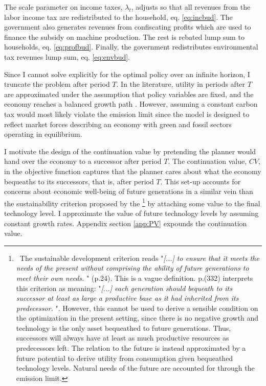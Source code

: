 The scale parameter on income taxes, $\lambda_t$, adjusts so that all revenues from the labor income tax are redistributed to the household, eq. \eqref{eq:incbud}.
The government also generates revenues from confiscating profits which are used to finance the subsidy on machine production. The rest is rebated lump sum to households, eq. \eqref{eq:profbud}. 
Finally, the government redistributes environmental tax revenues lump sum, eq. \eqref{eq:envbud}.


Since I cannot solve explicitly for the optimal policy over an infinite horizon, I truncate the problem after period $T$. 
In the literature, utility in periods after $T$ are approximated under the assumption that policy variables are fixed, and the economy reaches a balanced growth path \citep{Barrage2019OptimalPolicy, Jones1993OptimalGrowth}. However, assuming a constant carbon tax would most likely violate the emission limit since the model is designed to reflect market forces describing an economy with green and fossil sectors operating in equilibrium. 

I motivate the design of the continuation value by pretending the planner would hand over the economy to a successor after period $T$. The continuation value, $CV$, in the objective function captures that the planner cares about what the economy bequeaths to its successors, that is, after period $T$. 
This set-up accounts for concerns about economic well-being of future generations in a similar vein than the sustainability criterion proposed by the \cite{UNSUS}\footnote{\ The sustainable development criterion reads "\textit{[...] to ensure that it meets the needs of the present without comprising the ability of future generations to meet their own needs.
	}" (p.24). This is a vague definition.  \cite{Dasgupta2021} p.(332) interprets this criterion as meaning: 
	"\textit{[...] each generation should bequeath to its successor at least as large a productive base as it had inherited from its predecessor. }". 
	However, this cannot be used to derive a sensible condition on the optimization in the present setting, since there is no negative growth and technology is the only asset bequeathed to future generations. Thus,
	successors will always have at least as much productive resources as predecessors left. The relation to the future is instead approximated by a future potential to derive utility from consumption given bequeathed technology levels. Natural needs of the future are accounted for through the emission limit. } by attaching some value to the final technology level. I approximate the value of future technology levels by assuming constant growth rates.  Appendix section \ref{app:PV} expounds  the continuation value.


